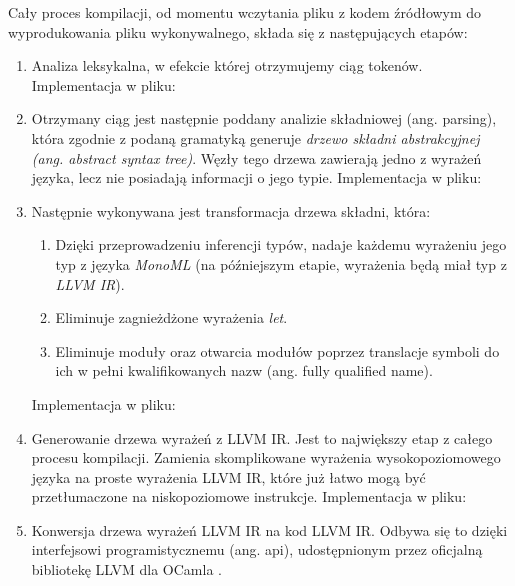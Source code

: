 \documentclass[declaration,shortabstract]{iithesis}
\begin{document}
Cały proces kompilacji, od momentu wczytania pliku z kodem źródłowym do 
wyprodukowania pliku wykonywalnego, składa się z następujących etapów:
\begin{enumerate}
  \item Analiza leksykalna, w efekcie której otrzymujemy ciąg tokenów. 
  Implementacja w pliku: 

  \item Otrzymany ciąg jest następnie poddany analizie składniowej 
  (ang. parsing), która zgodnie z podaną gramatyką generuje \textit{drzewo 
  składni abstrakcyjnej (ang. abstract syntax tree)}. Węzły tego drzewa 
  zawierają jedno z wyrażeń języka, 
  lecz nie posiadają informacji o jego typie. 
  Implementacja w pliku: \newline
 
  \item Następnie wykonywana jest transformacja drzewa składni, która:

  \begin{enumerate}
    \item Dzięki przeprowadzeniu inferencji typów, nadaje każdemu wyrażeniu jego typ z języka \textit{MonoML} (na późniejszym etapie, wyrażenia będą miał typ 
    z \textit{LLVM IR}). 
    \item Eliminuje zagnieżdżone wyrażenia \textit{let}.
    \item Eliminuje moduły oraz otwarcia modułów poprzez translacje symboli do 
    ich w pełni kwalifikowanych nazw (ang. fully qualified name).
  \end{enumerate}
  Implementacja w pliku: 

  \item Generowanie drzewa wyrażeń z LLVM IR. Jest to największy etap z całego 
  procesu kompilacji. Zamienia skomplikowane wyrażenia wysokopoziomowego języka
  na proste wyrażenia LLVM IR, które już łatwo mogą być przetłumaczone na 
  niskopoziomowe instrukcje.
  Implementacja w pliku: 

  \item Konwersja drzewa wyrażeń LLVM IR na kod LLVM IR. Odbywa się to dzięki 
  interfejsowi programistycznemu (ang. api), udostępnionym przez oficjalną 
  bibliotekę LLVM dla OCamla \cite{llvm_in_ocaml}.

\end{enumerate}
\end{document}
